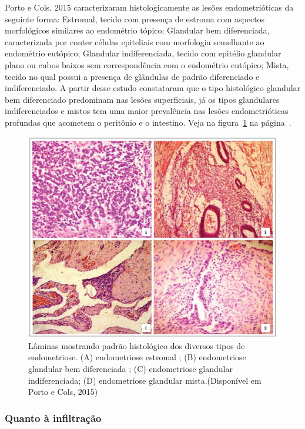 \documentclass[12pt]{article} %
\begin{document}
Porto e Cols, 2015 caracterizaram histologicamente as lesões
endometrióticas da seguinte forma: Estromal, tecido com presença de
estroma com aspectos morfológicos similares ao endométrio tópico;
Glandular bem diferenciada, caracterizada por conter células
epiteliais com morfologia semelhante ao endométrio eutópico; Glandular
indiferenciada, tecido com epitélio glandular plano ou cubos baixos
sem correspondência com o endométrio eutópico; Mista, tecido no qual
possui a presença de glândulas de padrão diferenciado e
indiferenciado. A partir desse estudo constataram que o tipo
histológico glandular bem diferenciado predominam nas lesões
superficiais, já os tipos glandulares indiferenciados e mistos tem uma
maior prevalência nas lesões endometrióticas profundas que acometem o
peritônio e o intestino. Veja na figura~\ref{histologico} na
página~\pageref{histologico}.

\begin{figure}[h!]
\centering
\includegraphics[width=16cm]{citoendometriose1636.jpg}
\caption[Amostras histológicas de diversos tipos de endometriose]{Lâminas mostrando padrão histológico dos diversos tipos de endometriose. (A) endometriose estromal ; (B) endometriose glandular bem diferenciada ; (C) endometriose glandular indiferenciada; (D) endometriose glandular mista.(Disponível em Porto e Cols, 2015)}
\label{histologico}
\end{figure} 


\subsubsection{Quanto à infiltração}
\end{document}
